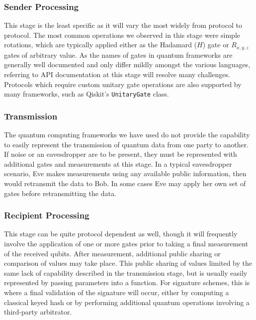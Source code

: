 \documentclass[sigconf]{acmart}
\begin{document}
\subsubsection{Sender Processing}
This stage is the least specific as it will vary the most widely from protocol to protocol. The most common operations we observed in this stage were simple rotations, which are typically applied either as the Hadamard ($H$) gate or $R_{x,y,z}$ gates of arbitrary value. As the names of gates in quantum frameworks are generally well documented and only differ mildly amongst the various languages, referring to API documentation at this stage will resolve many challenges. Protocols which require custom unitary gate operations are also supported by many frameworks, such as Qiskit's \texttt{UnitaryGate} class.

\subsubsection{Transmission}
The quantum computing frameworks we have used do not provide the capability to easily represent the transmission of quantum data from one party to another. If noise or an eavesdropper are to be present, they must be represented with additional gates and measurements at this stage. In a typical eavesdropper scenario, Eve makes measurements using any available public information, then would retransmit the data to Bob. In some cases Eve may apply her own set of gates before retransmitting the data.

\subsubsection{Recipient Processing}
This stage can be quite protocol dependent as well, though it will frequently involve the application of one or more gates prior to taking a final measurement of the received qubits. After measurement, additional public sharing or comparison of values may take place. This public sharing of values limited by the same lack of capability described in the transmission stage, but is usually easily represented by passing parameters into a function. For signature schemes, this is where a final validation of the signature will occur, either by computing a classical keyed hash or by performing additional quantum operations involving a third-party arbitrator.
\end{document}

